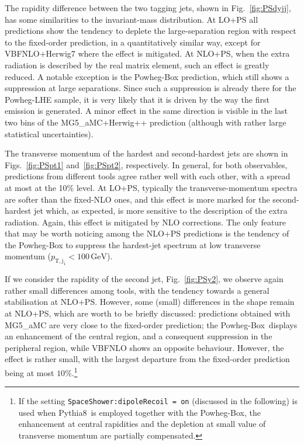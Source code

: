 \documentclass[twocolumn,epjc3]{svjour3} %
\newcommand{\Pj}{\ensuremath{\text{j}}\xspace}
\newcommand{\GeV}{\ensuremath{\,\text{GeV}}\xspace}
\newcommand{\ptsub}[1]{\ensuremath{p_{\text{T},#1}}\xspace}
\begin{document}
The rapidity difference between the two tagging jets, shown in Fig.~\ref{fig:PSdyjj}, has some similarities to the invariant-mass distribution.
At LO+PS all predictions show the tendency to deplete the large-separation region with respect to the fixed-order prediction, in a
quantitatively similar way,
except for {\sc VBFNLO+Herwig7} where the effect is mitigated. At 
NLO+PS, when the extra radiation is described by the real matrix element, such an effect is greatly reduced. A notable
exception is the {\sc Powheg-Box} prediction, which still shows a suppression at large separations.
Since such a suppression is already there for the {\sc Powheg-LHE} sample,
it is very likely that it is driven by the way the first emission is generated. A minor effect in the same direction is visible in the last two bins of the
{\sc MG5\_aMC+Herwig++} prediction (although with rather large statistical uncertainties).



The transverse momentum of the hardest and second-hardest jets are shown in Figs.~\ref{fig:PSpt1} and~\ref{fig:PSpt2}, respectively. In general, for both observables,
predictions from different tools agree rather well with each other, with a spread at most at the 10\% level. At LO+PS, typically the transverse-momentum spectra are softer than
the fixed-NLO ones, and this effect is more marked for the second-hardest jet which, as expected, is more sensitive to the description of the extra radiation. Again, this
effect is mitigated by NLO corrections. The only feature that may be worth noticing among the NLO+PS predictions is the tendency of the {\sc Powheg-Box} to suppress the
hardest-jet spectrum at low transverse momentum ($\ptsub{\Pj_1}<100 \GeV$).

If we consider the rapidity of the second jet, Fig.~\ref{fig:PSy2}, we observe again rather small differences among tools, with the tendency towards a general
stabilisation at NLO+PS. However, some (small) differences in the shape remain at NLO+PS, which are worth to be briefly discussed: predictions
obtained with {\sc MG5\_aMC} are very close to the fixed-order prediction; the {\sc Powheg-Box}\ displays an enhancement of the central region, and a consequent suppression in the
peripheral region, while {\sc VBFNLO} shows an opposite behaviour. However, the effect is rather small, with the largest departure from the fixed-order prediction being
at most $10\%$.\footnote{If the setting {\tt SpaceShower:dipole\-Recoil = on} (discussed in the following)
is used when {\sc Pythia8}\ is employed together with the {\sc Powheg-Box}, the enhancement at central rapidities and the depletion
at small value of transverse momentum are partially compensated.}
\end{document}

